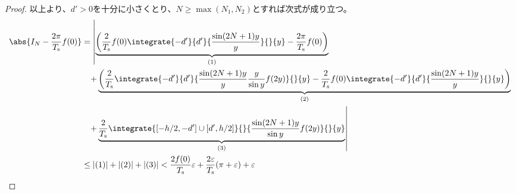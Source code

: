 \begin{proof}
            以上より、$d'>0$を十分に小さくとり、$N\geq\max(N_1,N_2)$とすれば次式が成り立つ。
            \begin{align*}
                \abs{I_N - \frac{2\pi}{\Tsamp} f(0)} &= \left|\underbrace{\left(\frac{2}{\Tsamp}f(0)\integrate{-d'}{d'}{\frac{\sin(2N+1)y}{y}}{}{y} - \frac{2\pi}{\Tsamp} f(0)\right)}_{(1)} \right. \\
                &\phantom{=} \left.+ \underbrace{\left(\frac{2}{\Tsamp}\integrate{-d'}{d'}{\frac{\sin(2N+1)y}{y}\frac{y}{\sin y}f(2y)}{}{y} - \frac{2}{\Tsamp}f(0)\integrate{-d'}{d'}{\frac{\sin(2N+1)y}{y}}{}{y}\right)}_{(2)} \right. \\
                &\phantom{=} \left.+ \underbrace{\frac{2}{\Tsamp}\integrate{[-h/2,-d']\cup[d',h/2]}{}{\frac{\sin(2N+1)y}{\sin y}f(2y)}{}{y}}_{(3)}\right| \\
                &\leq |(1)| + |(2)| + |(3)| < \frac{2f(0)}{\Tsamp}\varepsilon + \frac{2\varepsilon}{\Tsamp}(\pi+\varepsilon) + \varepsilon
            \end{align*}
        \end{proof}
